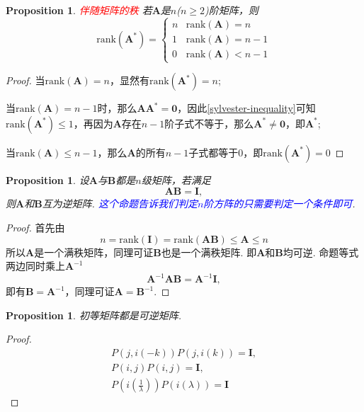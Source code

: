 \documentclass{article}
\newtheorem{proposition}[theorem]{Proposition}
\newcommand{\mbf}[1]{\bm{#1}}
\newcommand{\rank}[1]{\text{rank}\left(#1\right)} %
\newcommand{\redt}[1]{\textcolor{red}{#1}}
\newcommand{\bluet}[1]{\textcolor{blue}{#1}}
\begin{document}
\begin{proposition}
\rm \redt{伴随矩阵的秩} 若$\mbf{A}$是$n$($n \geq 2$)阶矩阵，则
$$
\rank{\mbf{A}^*} = \left\{ \begin{array}{ll}
n & \rank{\mbf{A}} = n \\
1 & \rank{\mbf{A}} = n-1 \\
0 & \rank{\mbf{A}} < n-1 
\end{array} \right.
$$ 
\end{proposition}

\begin{proof}
当$\rank{\mbf{A}} = n$，显然有$\rank{\mbf{A}^*} = n$; 

当$\rank{\mbf{A}} = n-1$时，那么$\mbf{A}\mbf{A}^* = \mbf{0}$，因此\ref{sylvester-inequality}可知$\rank{\mbf{A}^*} \leq 1$，再因为$\mbf{A}$存在$n-1$阶子式不等于，那么$\mbf{A}^* \neq \mbf{0}$，即$\mbf{A}^*$; 

当$\rank{\mbf{A}} \leq n-1$，那么$\mbf{A}$的所有$n-1$子式都等于$0$，即$\rank{\mbf{A}^*} = 0$
\end{proof}

\begin{proposition}\label{invertible: prop1}
\rm 设$\mbf{A}$与$\mbf{B}$都是$n$级矩阵，若满足
$$
\mbf{A} \mbf{B} = \mbf{I},
$$
则$\mbf{A}$和$\mbf{B}$互为逆矩阵. \bluet{这个命题告诉我们判定$n$阶方阵的只需要判定一个条件即可}. 
\end{proposition}

\begin{proof}
首先由
$$
n =\rank{\mbf{I}} =  \rank{\mbf{A} \mbf{B}} \leq \mbf{A} \leq n
$$
所以$\mbf{A}$是一个满秩矩阵，同理可证$\mbf{B}$也是一个满秩矩阵. 即$\mbf{A}$和$\mbf{B}$均可逆. 命题等式两边同时乘上$\mbf{A}^{-1}$
$$
\mbf{A}^{-1}\mbf{A}\mbf{B} = \mbf{A}^{-1}\mbf{I},
$$
即有$\mbf{B} = \mbf{A}^{-1}$，同理可证$\mbf{A} = \mbf{B}^{-1}$.
\end{proof}

\begin{proposition}\label{invertible: id}
\rm 初等矩阵都是可逆矩阵.
\end{proposition}

\begin{proof}
$$
\begin{array}{ll}
P(j,i(-k))P(j,i(k)) = \mbf{I},\\
P(i,j)P(i,j) = \mbf{I},\\
P(i(\frac{1}{\lambda}))P(i(\lambda)) = \mbf{I} 
\end{array}
$$
\end{proof}
\end{document}
